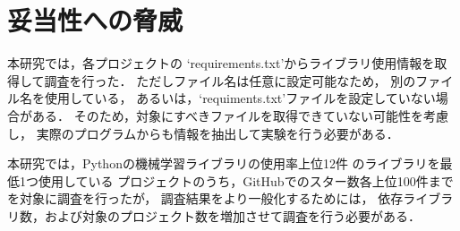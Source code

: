 \section{妥当性への脅威\label{threats}}

  本研究では，各プロジェクトの
  `requirements.txt'からライブラリ使用情報を取得して調査を行った．
  ただしファイル名は任意に設定可能なため，
  別のファイル名を使用している，
  あるいは，`requiments.txt'ファイルを設定していない場合がある．
  そのため，対象にすべきファイルを取得できていない可能性を考慮し，
  実際のプログラムからも情報を抽出して実験を行う必要がある．

  本研究では，Pythonの機械学習ライブラリの使用率上位12件%
  のライブラリを最低1つ使用している
  プロジェクトのうち，GitHubでのスター数各上位100件までを対象に調査を行ったが，
  調査結果をより一般化するためには，
  依存ライブラリ数，および対象のプロジェクト数を増加させて調査を行う必要がある．

